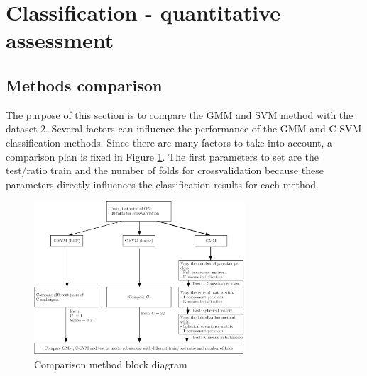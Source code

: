 \documentclass[a4paper,10pt]{article}
\begin{document}


\section{Classification - quantitative assessment}

\subsection{Methods comparison}

The purpose of this section is to compare the GMM and SVM method with the dataset 2. Several factors can influence the performance of the GMM and C-SVM classification methods. Since there are many factors to take into account, a comparison plan is fixed in Figure \ref{fig:comparison-block-diag}. The first parameters to set are the test/ratio train and the number of folds for crossvalidation because these parameters directly influences the classification results for each method.


\begin{figure}[H]
	\centering
	\includegraphics[width=0.7\textwidth]{pictures/comparison-block-diag}
	\caption{Comparison method block diagram}
	\label{fig:comparison-block-diag}
\end{figure}
\end{document}

